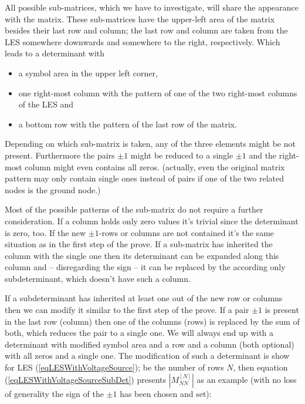 All possible sub-matrices, which we have to investigate, will share the
appearance with the matrix. These sub-matrices have the upper-left area of
the matrix besides their last row and column; the last row and column are
taken from the LES somewhere downwards and somewhere to the right,
respectively. Which leads to a determinant with

\begin{itemize}
  \item a symbol area in the upper left corner,
  \item one right-most column with the pattern of one of the two
    right-most columns of the LES and
  \item a bottom row with the pattern of the last row of the matrix.
\end{itemize}

Depending on which sub-matrix is taken, any of the three elements might be
not present. Furthermore the pairs $\pm 1$ might be reduced to a single
$\pm 1$ and the right-most column might even contains all zeros.
(actually, even the original matrix pattern may only contain single ones
instead of pairs if one of the two related nodes is the ground node.)

Most of the possible patterns of the sub-matrix do not require a further
consideration. If a column holds only zero values it's trivial since the
determinant is zero, too. If the new $\pm 1$-rows or columns are not
contained it's the same situation as in the first step of the prove. If a
sub-matrix has inherited the column with the single one then its
determinant can be expanded along this column and -- disregarding the sign
-- it can be replaced by the according only subdeterminant, which doesn't
have such a column.

If a subdeterminant has inherited at least one out of the new row or columns
then we can modify it similar to the first step of the prove. If a pair
$\pm 1$ is present in the last row (column) then one of the columns (rows)
is replaced by the sum of both, which reduces the pair to a single one. We
will always end up with a determinant with modified symbol area and a row
and a column (both optional) with all zeros and a single one. The
modification of such a determinant is show for LES
(\ref{eqLESWithVoltageSource}); be the number of rows $N$, then equation
(\ref{eqLESWithVoltageSourceSubDet}) presents $\left|M^{[N]}_{NN}\right|$
as an example (with no loss of generality the sign of the $\pm 1$ has been
chosen and set):

